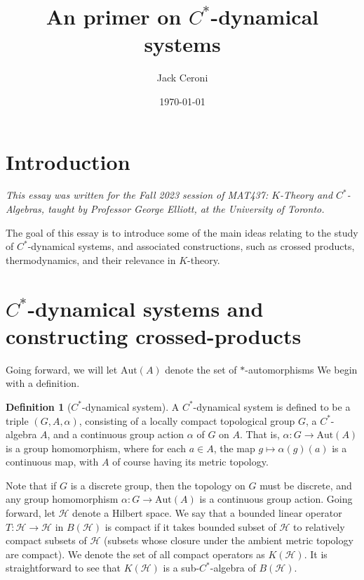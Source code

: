 \documentclass[aps,pra,showpacs,notitlepage,onecolumn,superscriptaddress,nofootinbib]{revtex4-1}
\theoremstyle{definition}
\newtheorem{definition}{Definition}[section]
\begin{document}
\title{An primer on $C^{*}$-dynamical systems}
\author{Jack Ceroni}

\date{\today}

\maketitle

\section{Introduction}

\noindent \emph{This essay was written for the Fall 2023 session of MAT437: $K$-Theory and $C^{*}$-Algebras, taught by Professor George Elliott, at the University of Toronto.}
\newline

\noindent The goal of this essay is to introduce some of the main ideas relating to the study of $C^{*}$-dynamical systems, and associated constructions, such as crossed products, thermodynamics,
and their relevance in $K$-theory.

\section{$C^{*}$-dynamical systems and constructing crossed-products}

\noindent Going forward, we will let $\text{Aut}(A)$ denote the set of $*$-automorphisms We begin with a definition.

\begin{definition}[$C^{*}$-dynamical system]
  A $C^{*}$-dynamical system is defined to be a triple $(G, A, \alpha)$, consisting of a locally compact topological group $G$, a $C^{*}$-algebra $A$,
  and a continuous group action $\alpha$ of $G$ on $A$. That is, $\alpha : G \rightarrow \text{Aut}(A)$ is a group homomorphism, where for each $a \in A$, the map $g \mapsto \alpha(g)(a)$
  is a continuous map, with $A$ of course having its metric topology.
\end{definition}

\noindent Note that if $G$ is a discrete group, then the topology on $G$ must be discrete, and any group homomorphism $\alpha : G \rightarrow \text{Aut}(A)$ is a continuous group action.
Going forward, let $\mathcal{H}$ denote a Hilbert space. We say that a bounded linear operator $T : \mathcal{H} \rightarrow \mathcal{H}$ in $B(\mathcal{H})$ is compact if
it takes bounded subset of $\mathcal{H}$ to relatively compact subsets of $\mathcal{H}$ (subsets whose closure under the ambient metric topology are compact). We denote the set of all compact operators
as $K(\mathcal{H})$. It is straightforward to
see that $K(\mathcal{H})$ is a sub-$C^{*}$-algebra of $B(\mathcal{H})$.
\end{document}
